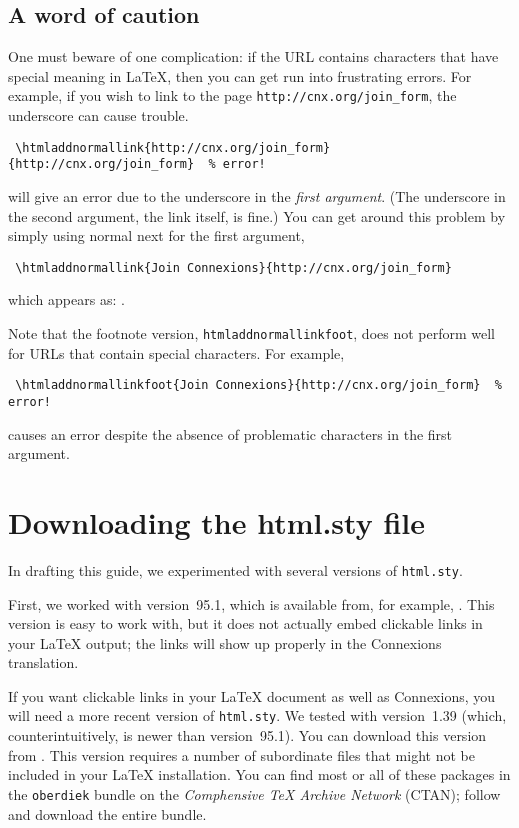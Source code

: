 \documentclass[11pt]{article}
\begin{document}
\subsection{A word of caution}
One must beware of one complication: if the URL contains characters
that have special meaning in LaTeX, then you can get run into frustrating errors.
For example, if you wish to link to the page \verb|http://cnx.org/join_form|,
the underscore can cause trouble.
\begin{verbatim}
 \htmladdnormallink{http://cnx.org/join_form}{http://cnx.org/join_form}  % error!
\end{verbatim}
will give an error due to the underscore in the \emph{first argument}.
(The underscore in the second argument, the link itself, is fine.)
You can get around this problem by simply using normal next for the first argument,
\begin{verbatim}
 \htmladdnormallink{Join Connexions}{http://cnx.org/join_form} 
\end{verbatim}
which appears as: .

Note that the footnote version,
\verb|htmladdnormallinkfoot|,
does not perform well for URLs that contain special characters.
For example,
\begin{verbatim}
 \htmladdnormallinkfoot{Join Connexions}{http://cnx.org/join_form}  % error!
\end{verbatim}
causes an error despite the absence of problematic characters in the first argument.

\section{Downloading the html.sty file} \label{sec:download}

In drafting this guide, we experimented with several versions of
\verb|html.sty|.  

First, we worked with version~95.1, which is available from, for example,
.
This version is easy to work with, but it does not actually embed clickable
links in your LaTeX output; the links will show up properly in the Connexions
translation. 

If you want clickable links in your LaTeX document as well as Connexions,
you will need a more recent version of \verb|html.sty|.  
We tested with version~1.39 (which, counterintuitively, is newer than
version~95.1).  You can download this version from 
.
This version requires a number of subordinate files that might not be included
in your LaTeX installation.  You can find most or all
of these packages in the \verb|oberdiek| bundle on the
 \emph{Comphensive TeX Archive Network} (CTAN); follow
and download the entire bundle.
\end{document}
